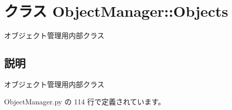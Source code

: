 \section{クラス ObjectManager::Objects}
\label{classsource__py_1_1_object_manager_1_1_object_manager_1_1_objects}
オブジェクト管理用内部クラス  




\subsection{説明}
オブジェクト管理用内部クラス 

 ObjectManager.py の 114 行で定義されています。